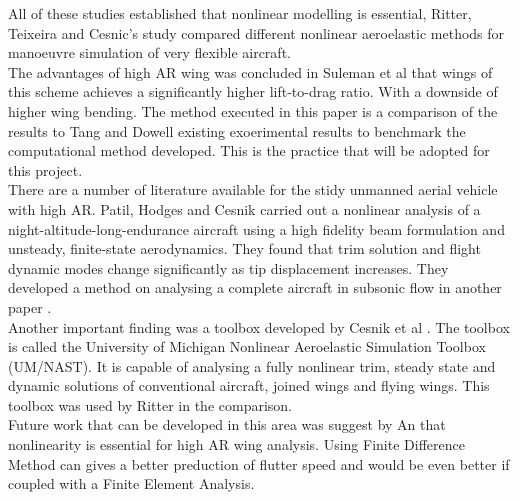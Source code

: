 \documentclass[11pt]{article}
\begin{document}
All of these studies established that nonlinear modelling is essential, Ritter, Teixeira and Cesnic's study \cite{Ritter2018ComparisonAircraft} compared different nonlinear aeroelastic methods for manoeuvre simulation of very flexible aircraft.\\

The advantages of high AR wing was concluded in Suleman et al \cite{Suleman2017Non-linearVariation} that wings of this scheme achieves a significantly higher lift-to-drag ratio. With a downside of higher wing bending. The method executed in this paper is a comparison of the results to Tang and Dowell\cite{Tang2001ExperimentalWings} existing exoerimental results to benchmark the computational method developed. This is the practice that will be adopted for this project.\\

There are a number of literature available for the stidy unmanned aerial vehicle with high AR. Patil, Hodges and Cesnik \cite{Patil2008NonlinearFlow} carried out a nonlinear analysis of a night-altitude-long-endurance aircraft using a high fidelity beam formulation and unsteady, finite-state aerodynamics. They found that trim solution and flight dynamic modes change significantly as tip displacement increases. They developed a method on analysing a complete aircraft in subsonic flow in another paper \cite{Patil2008NonlinearAircraft}.\\

Another important finding was a toolbox developed by Cesnik et al \cite{Cesnik2005NonlinearAircraft}. The toolbox is called the University of Michigan Nonlinear Aeroelastic Simulation Toolbox (UM/NAST). It is capable of analysing a fully nonlinear trim, steady state and dynamic solutions of conventional aircraft, joined wings and flying wings. This toolbox was used by Ritter \cite{Ritter2018ComparisonAircraft} in the comparison.\\

Future work that can be developed in this area was suggest by An \cite{An2015AeroelasticRequirements} that nonlinearity is essential for high AR wing analysis. Using Finite Difference Method can gives a better preduction of flutter speed and would be even better if coupled with a Finite Element Analysis.\\
\end{document}

